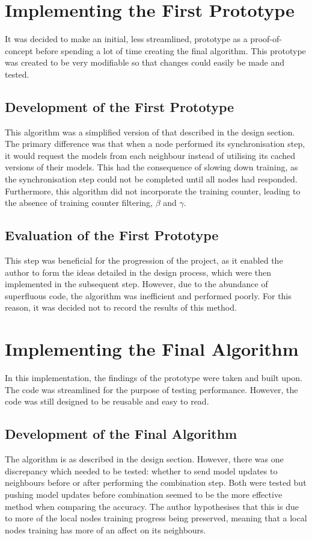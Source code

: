\section{Implementing the First Prototype}
It was decided to make an initial, less streamlined, prototype as a proof-of-concept before spending a lot of time creating the final algorithm. This prototype was created to be very modifiable so that changes could easily be made and tested.

\subsection{Development of the First Prototype} \label{reasonforcache}
This algorithm was a simplified version of that described in the design section. The primary difference was that when a node performed its synchronisation step, it would request the models from each neighbour instead of utilising its cached versions of their models. This had the consequence of slowing down training, as the synchronisation step could not be completed until all nodes had responded. Furthermore, this algorithm did not incorporate the training counter, leading to the absence of training counter filtering, $\beta$ and $\gamma$.

\subsection{Evaluation of the First Prototype}
This step was beneficial for the progression of the project, as it enabled the author to form the ideas detailed in the design process, which were then implemented in the subsequent step. However, due to the abundance of superfluous code, the algorithm was inefficient and performed poorly. For this reason, it was decided not to record the results of this method.

\section{Implementing the Final Algorithm}
In this implementation, the findings of the prototype were taken and built upon. The code was streamlined for the purpose of testing performance. However, the code was still designed to be reusable and easy to read.

\subsection{Development of the Final Algorithm}
The algorithm is as described in the design section. However, there was one discrepancy which needed to be tested: whether to send model updates to neighbours before or after performing the combination step. Both were tested but pushing model updates before combination seemed to be the more effective method when comparing the accuracy. The author hypothesises that this is due to more of the local nodes training progress being preserved, meaning that a local nodes training has more of an affect on its neighbours.

